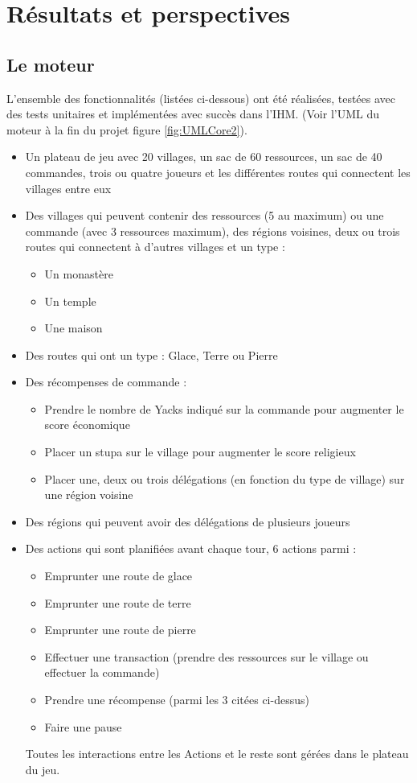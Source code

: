\section{Résultats et perspectives}

\subsection{Le moteur}
L'ensemble des fonctionnalités (listées ci-dessous) ont été réalisées, testées avec des tests unitaires et implémentées avec succès dans l'IHM. (Voir l'UML du moteur à la fin du projet figure \ref{fig:UMLCore2}).
\begin{itemize}
	\item Un plateau de jeu avec 20 villages, un sac de 60 ressources, un sac de 40 commandes, trois ou quatre joueurs et les différentes routes qui connectent les villages entre eux
	\item Des villages qui peuvent contenir des ressources (5 au maximum) ou une commande (avec 3 ressources maximum), des régions voisines, deux ou trois routes qui connectent à d'autres villages et un type :
	\begin{itemize}
		\item Un monastère
		\item Un temple
		\item Une maison
	\end{itemize}
	\item Des routes qui ont un type : Glace, Terre ou Pierre
	\item Des récompenses de commande : 
	\begin{itemize}
		\item Prendre le nombre de Yacks indiqué sur la commande pour augmenter le score économique
		\item Placer un stupa sur le village pour augmenter le score religieux
		\item Placer une, deux ou trois délégations (en fonction du type de village) sur une région voisine
	\end{itemize}
	\item Des régions qui peuvent avoir des délégations de plusieurs joueurs
	\item Des actions qui sont planifiées avant chaque tour, 6 actions parmi : 
	\begin{itemize}
		\item Emprunter une route de glace
		\item Emprunter une route de terre
		\item Emprunter une route de pierre
		\item Effectuer une transaction (prendre des ressources sur le village ou effectuer la commande)
		\item Prendre une récompense (parmi les 3 citées ci-dessus)
		\item Faire une pause
	\end{itemize}
	Toutes les interactions entre les Actions et le reste sont gérées dans le plateau du jeu.
\end{itemize} 

